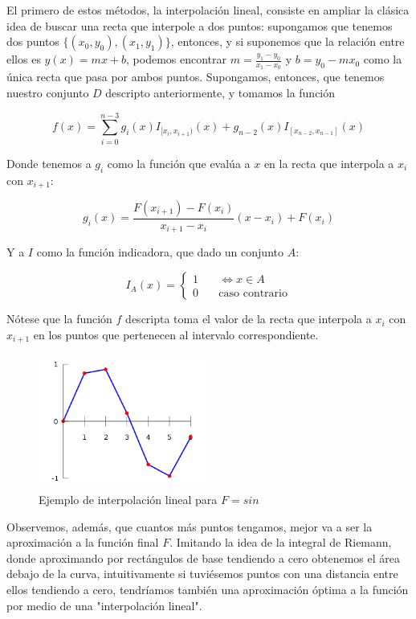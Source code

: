 \documentclass{article}
\begin{document}
El primero de estos métodos, la interpolación lineal, consiste en ampliar la clásica idea de buscar una recta que interpole a dos puntos: supongamos que tenemos dos puntos $\{(x_0, y_0), (x_1, y_1)\}$, entonces, y si suponemos que la relación entre ellos es $y(x) = mx + b$, podemos encontrar $m = \frac{y_1 - y_0}{x_1 - x_0}$ y $b = y_0 - m x_0$ como la única recta que pasa por ambos puntos. Supongamos, entonces, que tenemos nuestro conjunto $D$ descripto anteriormente, y tomamos la función

$$f(x) = \sum_{i=0}^{n-3} g_i(x) I_{[x_i, x_{i+1})}(x) + g_{n-2}(x) I_{[x_{n-2}, x_{n-1}]}(x)$$

Donde tenemos a $g_i$ como la función que evalúa a $x$ en la recta que interpola a $x_i$ con $x_{i+1}$:

$$g_{i}(x) = \frac{F(x_{i+1}) - F(x_i)}{x_{i+1} - x_i} (x - x_i) + F(x_i)$$

Y a $I$ como la función indicadora, que dado un conjunto $A$:

$$I_A(x) =
    \begin{cases}
        1 & \quad \iff x \in A\\
        0 & \quad \text{caso contrario}
    \end{cases}$$
    
Nótese que la función $f$ descripta toma el valor de la recta que interpola a $x_i$ con $x_{i+1}$ en los puntos que pertenecen al intervalo correspondiente.

\begin{figure}
\caption{Ejemplo de interpolación lineal para $F = sin$}\label{wrap-fig:1}
\includegraphics[width=5.5cm]{LinearInterpolationSine.png}
\end{figure} 


Observemos, además, que cuantos más puntos tengamos, mejor va a ser la aproximación a la función final $F$. Imitando la idea de la integral de Riemann, donde aproximando por rectángulos de base tendiendo a cero obtenemos el área debajo de la curva, intuitivamente si tuviésemos puntos con una distancia entre ellos tendiendo a cero, tendríamos también una aproximación óptima a la función por medio de una "interpolación lineal".
\end{document}
